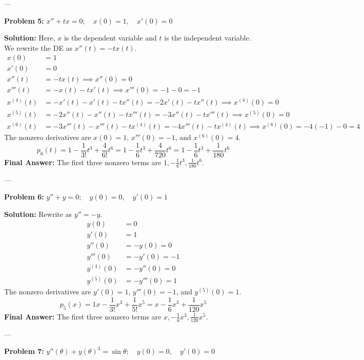 \documentclass[11pt, letterpaper]{article}
\theoremstyle{definition}
\theoremstyle{remark}
\begin{document}
---

\textbf{Problem 5:} $x'' + tx = 0 ; \quad x(0) = 1 , \quad x'(0) = 0$

\textbf{Solution:}
Here, $x$ is the dependent variable and $t$ is the independent variable. We rewrite the DE as $x''(t) = -tx(t)$.
\begin{align*}
    x(0) &= 1 \\
    x'(0) &= 0 \\
    x''(t) &= -tx(t) \implies x''(0) = 0 \\
    x'''(t) &= -x(t) - tx'(t) \implies x'''(0) = -1 - 0 = -1 \\
    x^{(4)}(t) &= -x'(t) - x'(t) - tx''(t) = -2x'(t) - tx''(t) \implies x^{(4)}(0) = 0 \\
    x^{(5)}(t) &= -2x''(t) - x''(t) - tx'''(t) = -3x''(t) - tx'''(t) \implies x^{(5)}(0) = 0 \\
    x^{(6)}(t) &= -3x'''(t) - x'''(t) - tx^{(4)}(t) = -4x'''(t) - tx^{(4)}(t) \implies x^{(6)}(0) = -4(-1) - 0 = 4
\end{align*}
The nonzero derivatives are $x(0)=1$, $x'''(0)=-1$, and $x^{(6)}(0)=4$.
\[ p_6(t) = 1 - \frac{1}{3!}t^3 + \frac{4}{6!}t^6 = 1 - \frac{1}{6}t^3 + \frac{4}{720}t^6 = 1 - \frac{1}{6}t^3 + \frac{1}{180}t^6 \]
\textbf{Final Answer:} The first three nonzero terms are $1, -\frac{1}{6}t^3, \frac{1}{180}t^6$.

---

\textbf{Problem 6:} $y'' + y = 0 ; \quad y(0) = 0 , \quad y'(0) = 1$

\textbf{Solution:}
Rewrite as $y'' = -y$.
\begin{align*}
    y(0) &= 0 \\
    y'(0) &= 1 \\
    y''(0) &= -y(0) = 0 \\
    y'''(0) &= -y'(0) = -1 \\
    y^{(4)}(0) &= -y''(0) = 0 \\
    y^{(5)}(0) &= -y'''(0) = 1
\end{align*}
The nonzero derivatives are $y'(0)=1$, $y'''(0)=-1$, and $y^{(5)}(0)=1$.
\[ p_5(x) = 1x - \frac{1}{3!}x^3 + \frac{1}{5!}x^5 = x - \frac{1}{6}x^3 + \frac{1}{120}x^5 \]
\textbf{Final Answer:} The first three nonzero terms are $x, -\frac{1}{6}x^3, \frac{1}{120}x^5$.

---

\textbf{Problem 7:} $y''(\theta) + y(\theta)^3 = \sin\theta ; \quad y(0) = 0 , \quad y'(0) = 0$
\end{document}
